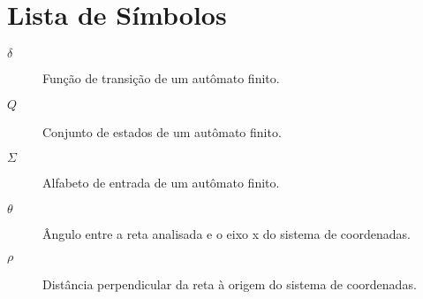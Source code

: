 \section*{Lista de Símbolos}
\begin{description}
  \item[$\delta$] Função de transição de um autômato finito.
  \item[$Q$] Conjunto de estados de um autômato finito.
  \item[$\Sigma$] Alfabeto de entrada de um autômato finito.
  \item [$\theta$] Ângulo entre a reta analisada e o eixo x do sistema de coordenadas.
  \item [$\rho$] Distância perpendicular da reta à origem do sistema de coordenadas.
\end{description}
